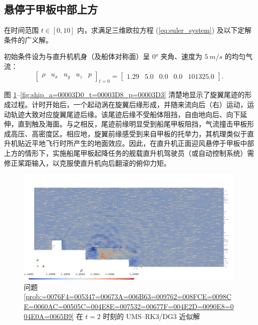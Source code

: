 \subsection{悬停于甲板中部上方}
\begin{problem}
[直升机正面迎风悬停于甲板中部上方]\label{prob:=0076F4=005347=00673A=006B63=009762=008FCE=0098CE=0060AC=00505C=004E8E=007532=00677F=004E2D=0090E8=004E0A=0065B9}在时间范围
$t\in[0,10]$ 内，求满足三维欧拉方程 (\ref{eq:euler_system}) 及以下定解条件的广义解。

初始条件设为与直升机机身（及船体对称面）呈 $\ang{0}$ 夹角、速度为 $\SI{5}{m/s}$ 的均匀气流：
\begin{equation}
\begin{bmatrix}\rho & u_{x} & u_{y} & u_{z} & p\end{bmatrix}_{t=0}=\begin{bmatrix}1.29 & 5.0 & 0.0 & 0.0 & 101325.0\end{bmatrix}.
\end{equation}
\end{problem}

图 \ref{fig:ship_a=00003D0_t=00003D2_p=00003D3}–\ref{fig:ship_a=00003D0_t=00003D8_p=00003D3}
清楚地显示了旋翼尾迹的形成过程。计时开始后，一个起动涡在旋翼后缘形成，并随来流向后（右）运动，运动轨迹大致对应旋翼尾迹后缘。该尾迹后缘不受船体阻挡，自由地向后、向下延伸，直到触及海面。与之相反，尾迹前缘明显受到船尾甲板阻挡，气流撞击甲板形成高压、高密度区。相应地，旋翼前缘感受到来自甲板的托举力，其机理类似于直升机贴近平地飞行时所产生的地面效应。因此，在直升机正面迎风悬停于甲板中部上方的情形下，实施船尾甲板起降任务的舰载直升机驾驶员（或自动控制系统）需修正桨距输入，以克服使直升机向后翻滚的俯仰力矩。

\begin{figure}[h!]
\begin{centering}
\includegraphics[width=1\textwidth,height=0.4\textheight,keepaspectratio]{figures/ship/a=0_p=3/Frame20}
\par\end{centering}
\caption{\label{fig:ship_a=00003D0_t=00003D2_p=00003D3}问题 \ref{prob:=0076F4=005347=00673A=006B63=009762=008FCE=0098CE=0060AC=00505C=004E8E=007532=00677F=004E2D=0090E8=004E0A=0065B9}
在 $t=2$ 时刻的 UMS–RK3/DG3 近似解}
\end{figure}

